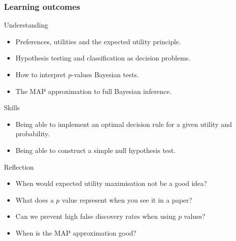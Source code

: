 \begin{frame}
  \frametitle{Learning outcomes}
  \begin{block}{Understanding}
    \begin{itemize}
    \item Preferences, utilities and the expected utility principle.
    \item Hypothesis testing and classification as decision problems.
    \item How to interpret $p$-values Bayesian tests.
    \item The MAP approximation to full Bayesian inference.
    \end{itemize}
  \end{block}
  
  \begin{block}{Skills}
    \begin{itemize}
    \item Being able to implement an optimal decision rule for a given utility and probability.
    \item Being able to construct a simple null hypothesis test.
    \end{itemize}
  \end{block}

  \begin{block}{Reflection}
    \begin{itemize}
    \item When would expected utility maximisation not be a good idea?
    \item What does a $p$ value represent when you see it in a paper?
    \item Can we prevent high false discovery rates when using $p$ values?
    \item When is the MAP approximation good?
    \end{itemize}
  \end{block}
  
\end{frame}







